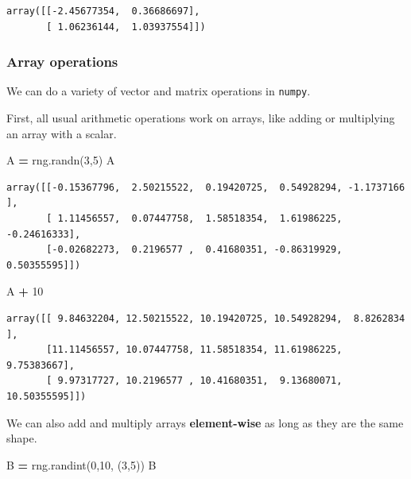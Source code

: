 \documentclass[
  letterpaper,
]{scrbook}
\newenvironment{Shaded}{\begin{snugshade}}{\end{snugshade}}
\newcommand{\DecValTok}[1]{\textcolor[rgb]{0.00,0.00,0.81}{#1}}
\newcommand{\NormalTok}[1]{#1}
\newcommand{\OperatorTok}[1]{\textcolor[rgb]{0.81,0.36,0.00}{\textbf{#1}}}
\begin{document}
\begin{verbatim}
array([[-2.45677354,  0.36686697],
       [ 1.06236144,  1.03937554]])
\end{verbatim}

\hypertarget{array-operations}{%
\subsubsection{Array operations}\label{array-operations}}

We can do a variety of vector and matrix operations in \texttt{numpy}.

First, all usual arithmetic operations work on arrays, like adding or multiplying an array with a scalar.

\begin{Shaded}
\begin{Highlighting}[]
\NormalTok{A }\OperatorTok{=}\NormalTok{ rng.randn(}\DecValTok{3}\NormalTok{,}\DecValTok{5}\NormalTok{)}
\NormalTok{A}
\end{Highlighting}
\end{Shaded}

\begin{verbatim}
array([[-0.15367796,  2.50215522,  0.19420725,  0.54928294, -1.1737166 ],
       [ 1.11456557,  0.07447758,  1.58518354,  1.61986225, -0.24616333],
       [-0.02682273,  0.2196577 ,  0.41680351, -0.86319929,  0.50355595]])
\end{verbatim}

\begin{Shaded}
\begin{Highlighting}[]
\NormalTok{A }\OperatorTok{+} \DecValTok{10}
\end{Highlighting}
\end{Shaded}

\begin{verbatim}
array([[ 9.84632204, 12.50215522, 10.19420725, 10.54928294,  8.8262834 ],
       [11.11456557, 10.07447758, 11.58518354, 11.61986225,  9.75383667],
       [ 9.97317727, 10.2196577 , 10.41680351,  9.13680071, 10.50355595]])
\end{verbatim}

We can also add and multiply arrays \textbf{element-wise} as long as they are the same shape.

\begin{Shaded}
\begin{Highlighting}[]
\NormalTok{B }\OperatorTok{=}\NormalTok{ rng.randint(}\DecValTok{0}\NormalTok{,}\DecValTok{10}\NormalTok{, (}\DecValTok{3}\NormalTok{,}\DecValTok{5}\NormalTok{))}
\NormalTok{B}
\end{Highlighting}
\end{Shaded}
\end{document}
